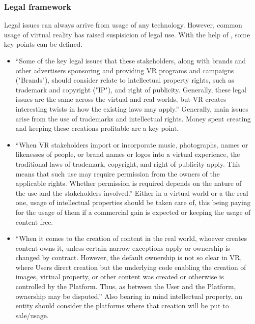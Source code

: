 \documentclass[preprint,12pt]{elsarticle}
\begin{document}
		\subsubsection{Legal framework}
		Legal issues can always arrive from usage of any technology.
		\newline However, common usage of virtual reality has raised
		suspisicion of legal use. With the help of \citet{VRLegal},
		some key points can be defined.

		\begin{itemize}
			\item
			``Some of the key legal issues that these stakeholders,
			along with brands and other advertisers sponsoring and
			providing VR programs and campaigns ("Brands"), should
			consider relate to intellectual property rights, such
			as trademark and copyright ("IP"), and right of
			publicity.  Generally, these legal issues are the same
			across the virtual and real worlds, but VR creates
			interesting twists in how the existing laws may
			apply.''
			\newline Generally, main issues arise from the
			use of trademarks and intellectual rights. Money spent
			creating and keeping these creations profitable are a
			key point.

			\item
			``When VR stakeholders import or incorporate music,
			photographs, names or likenesses of people, or brand
			names or logos into a virtual experience, the
			traditional laws of trademark, copyright, and right of
			publicity apply. This means that such use may require
			permission from the owners of the applicable rights.
			Whether permission is required depends on the nature of
			the use and the stakeholders involved.''
			\newline Either in a virtual world or a the real one,
			usage of intellectual properties should be taken care
			of, this being paying for the usage of them if a
			commercial gain is expected or keeping the usage of
			content free.

			\item
			``When it comes to the creation of content in the real
			world, whoever creates content owns it, unless certain
			narrow exceptions apply or ownership is changed by
			contract. However, the default ownership is not so
			clear in VR, where Users direct creation but the
			underlying code enabling the creation of images,
			virtual property, or other content was created or
			otherwise is controlled by the Platform. Thus, as
			between the User and the Platform, ownership may be
			disputed.''
			\newline Also bearing in mind intellectual property,
			an entity should consider the platforms where that
			creation will be put to sale/usage.
		\end{itemize}
\end{document}
